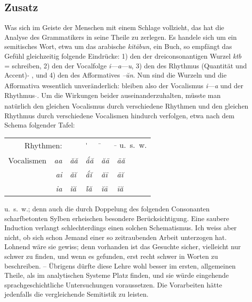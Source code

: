 \subsection*{Zusatz}\label{II.VI.zusatz}

Was sich im Geiste der Menschen mit einem Schlage vollzieht, das hat die Analyse des Grammatikers in seine Theile zu zerlegen. Es handele sich um ein semitisches Wort, etwa um das arabische  \textit{kitābun}, ein Buch, so empfängt das Gefühl gleichzeitig folgende Eindrücke: 1) den der dreiconsonantigen Wurzel \textit{ktb} = schreiben, 2) den der Vocalfolge \textit{i}—\textit{a}—\textit{u}, 3) den des Rhythmus (Quantität und Accent) \textsubscript{\LARGE \textbreve{ } \'̄ \textbreve{ }}, und 4) den des Afformatives \textit{–ŭn}. Nun sind die \label{sp.93} Wurzeln und die Afformativa wesentlich unveränderlich: bleiben also der Vocalismus \textit{i}—\textit{a} und der Rhythmus \textsubscript{\LARGE \textbreve{ } ̄}. Um die Wirkungen beider auseinanderzuhalten, müsste man natürlich den gleichen Vocalismus durch verschiedene Rhythmen und den gleichen Rhythmus durch verschiedene Vocalismen hindurch verfolgen, etwa nach dem Schema folgender Tafel:

\begin{table}[h]
\centering
\begin{tabular}{r r | l | l | l | l}
 \multicolumn{2}{r|}{Rhythmen:} &
      \textsubscript{\LARGE \textbreve{ }\textbreve{ }} & 
      \textsubscript{\LARGE \'{\textbreve{\rule{0pt}{1em}}}\textbreve{ }} & 
      \textsubscript{\LARGE \textbreve{ } ̄} & \enspace \textsubscript{\LARGE ̄\textbreve{ }} u.~s.~w. \\
\cmidrule(l{2em}){1-6}
Vocalismen & \textit{aa} & \textit{ăă} & \textit{ắă} & \textit{ăā} & \textit{āă} \\
 & \textit{ai} & \textit{ăĭ} & \textit{ắĭ} & \textit{ăī} & \textit{āĭ} \\
 & \textit{ia} & \textit{ĭă} & \textit{\'ĭă} & \textit{ĭā} & \textit{īă}
\end{tabular}
\end{table}

\noindent u.~s.~w.; denn auch die durch Doppelung des folgenden Consonanten scharfbetonten Sylben erheischen besondere Berücksichtigung. Eine saubere Induction verlangt schlechterdings einen solchen Schematismus. Ich weiss aber nicht, ob sich schon Jemand einer so zeitraubenden Arbeit \label{fp.96} unterzogen hat. Lohnend wäre sie gewiss; denn vorhanden ist das Gesuchte sicher, vielleicht nur schwer zu finden, und wenn es gefunden, erst recht schwer in Worten zu beschreiben. – Übrigens dürfte diese Lehre wohl besser im ersten, allgemeinen Theile, als im analytischen Systeme Platz finden, und sie würde eingehende sprachgeschichtliche Untersuchungen voraussetzen. Die Vorarbeiten hätte jedenfalls die vergleichende Semitistik zu leisten.

